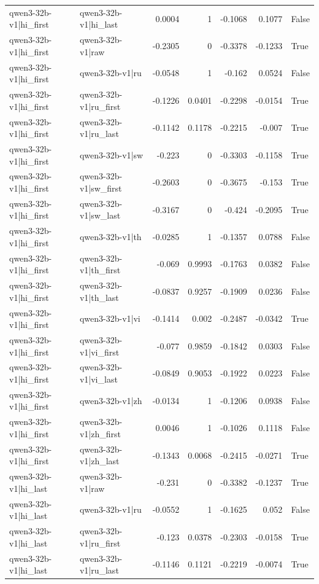 \begin{table}
\begin{tabular}{l l r r r r l}
qwen3-32b-v1|hi_first & qwen3-32b-v1|hi_last & 0.0004 & 1 & -0.1068 & 0.1077 & False \\
qwen3-32b-v1|hi_first & qwen3-32b-v1|raw & -0.2305 & 0 & -0.3378 & -0.1233 & True \\
qwen3-32b-v1|hi_first & qwen3-32b-v1|ru & -0.0548 & 1 & -0.162 & 0.0524 & False \\
qwen3-32b-v1|hi_first & qwen3-32b-v1|ru_first & -0.1226 & 0.0401 & -0.2298 & -0.0154 & True \\
qwen3-32b-v1|hi_first & qwen3-32b-v1|ru_last & -0.1142 & 0.1178 & -0.2215 & -0.007 & True \\
qwen3-32b-v1|hi_first & qwen3-32b-v1|sw & -0.223 & 0 & -0.3303 & -0.1158 & True \\
qwen3-32b-v1|hi_first & qwen3-32b-v1|sw_first & -0.2603 & 0 & -0.3675 & -0.153 & True \\
qwen3-32b-v1|hi_first & qwen3-32b-v1|sw_last & -0.3167 & 0 & -0.424 & -0.2095 & True \\
qwen3-32b-v1|hi_first & qwen3-32b-v1|th & -0.0285 & 1 & -0.1357 & 0.0788 & False \\
qwen3-32b-v1|hi_first & qwen3-32b-v1|th_first & -0.069 & 0.9993 & -0.1763 & 0.0382 & False \\
qwen3-32b-v1|hi_first & qwen3-32b-v1|th_last & -0.0837 & 0.9257 & -0.1909 & 0.0236 & False \\
qwen3-32b-v1|hi_first & qwen3-32b-v1|vi & -0.1414 & 0.002 & -0.2487 & -0.0342 & True \\
qwen3-32b-v1|hi_first & qwen3-32b-v1|vi_first & -0.077 & 0.9859 & -0.1842 & 0.0303 & False \\
qwen3-32b-v1|hi_first & qwen3-32b-v1|vi_last & -0.0849 & 0.9053 & -0.1922 & 0.0223 & False \\
qwen3-32b-v1|hi_first & qwen3-32b-v1|zh & -0.0134 & 1 & -0.1206 & 0.0938 & False \\
qwen3-32b-v1|hi_first & qwen3-32b-v1|zh_first & 0.0046 & 1 & -0.1026 & 0.1118 & False \\
qwen3-32b-v1|hi_first & qwen3-32b-v1|zh_last & -0.1343 & 0.0068 & -0.2415 & -0.0271 & True \\
qwen3-32b-v1|hi_last & qwen3-32b-v1|raw & -0.231 & 0 & -0.3382 & -0.1237 & True \\
qwen3-32b-v1|hi_last & qwen3-32b-v1|ru & -0.0552 & 1 & -0.1625 & 0.052 & False \\
qwen3-32b-v1|hi_last & qwen3-32b-v1|ru_first & -0.123 & 0.0378 & -0.2303 & -0.0158 & True \\
qwen3-32b-v1|hi_last & qwen3-32b-v1|ru_last & -0.1146 & 0.1121 & -0.2219 & -0.0074 & True \\

\end{tabular}
\end{table}
